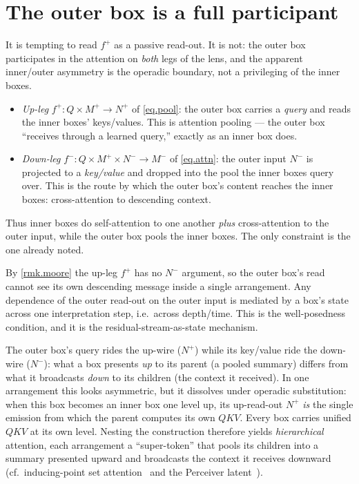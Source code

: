 \documentclass[11pt]{article}
\theoremstyle{plain}
\theoremstyle{definition}
\theoremstyle{remark}
\newcommand{\inpt}[1]{#1^{-}}
\newcommand{\outp}[1]{#1^{+}}
\begin{document}
\section{The outer box is a full participant}\label{sec.outer}

It is tempting to read $\outp f$ as a passive read-out. It is not: the
outer box participates in the attention on \emph{both} legs of the lens,
and the apparent inner/outer asymmetry is the operadic boundary, not a
privileging of the inner boxes.

\begin{itemize}
\item \emph{Up-leg} $\outp f\colon Q\times\outp M\to\outp N$ of
\eqref{eq.pool}: the outer box carries a \emph{query} and reads the inner
boxes' keys/values. This is attention pooling --- the outer box ``receives
through a learned query,'' exactly as an inner box does.
\item \emph{Down-leg} $\inpt f\colon Q\times\outp M\times\inpt N\to\inpt M$
of \eqref{eq.attn}: the outer input $\inpt N$ is projected to a
\emph{key/value} and dropped into the pool the inner boxes query over.
This is the route by which the outer box's content reaches the inner
boxes: cross-attention to descending context.
\end{itemize}

Thus inner boxes do self-attention to one another \emph{plus}
cross-attention to the outer input, while the outer box pools the inner
boxes. The only constraint is the one already noted.

\begin{observation}\label{obs.feedthrough}
By \cref{rmk.moore} the up-leg $\outp f$ has no $\inpt N$ argument, so the
outer box's read cannot see its own descending message inside a single
arrangement. Any dependence of the outer read-out on the outer input is
mediated by a box's state across one interpretation step, i.e.\ across
depth/time. This is the well-posedness condition, and it is the
residual-stream-as-state mechanism.
\end{observation}

\begin{remark}\label{rmk.supertoken}
The outer box's query rides the up-wire ($\outp N$) while its key/value
ride the down-wire ($\inpt N$): what a box presents \emph{up} to its
parent (a pooled summary) differs from what it broadcasts \emph{down} to
its children (the context it received). In one arrangement this looks
asymmetric, but it dissolves under operadic substitution: when this box
becomes an inner box one level up, its up-read-out $\outp N$ \emph{is} the
single emission from which the parent computes its own $\mathit{QKV}$.
Every box carries unified $\mathit{QKV}$ at its own level. Nesting the
construction therefore yields \emph{hierarchical} attention, each
arrangement a ``super-token'' that pools its children into a summary
presented upward and broadcasts the context it receives downward
(cf.\ inducing-point set attention~\cite{SetTransformer} and the Perceiver
latent~\cite{Perceiver}).
\end{remark}
\end{document}
